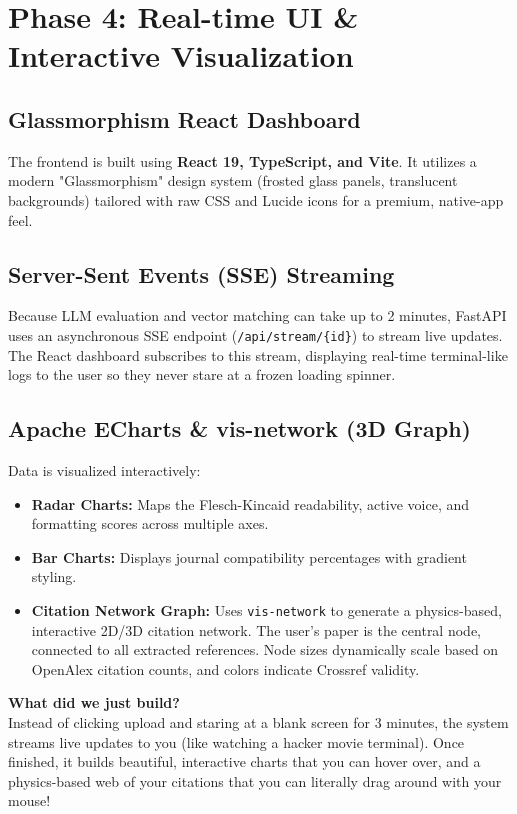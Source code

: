 \documentclass[11pt,a4paper]{article}
\begin{document}
\bigskip

\section{Phase 4: Real-time UI \& Interactive Visualization}

\subsection*{Glassmorphism React Dashboard}
The frontend is built using \textbf{React 19, TypeScript, and Vite}. It utilizes a modern "Glassmorphism" design system (frosted glass panels, translucent backgrounds) tailored with raw CSS and Lucide icons for a premium, native-app feel.

\subsection*{Server-Sent Events (SSE) Streaming}
Because LLM evaluation and vector matching can take up to 2 minutes, FastAPI uses an asynchronous SSE endpoint (\texttt{/api/stream/\{id\}}) to stream live updates. The React dashboard subscribes to this stream, displaying real-time terminal-like logs to the user so they never stare at a frozen loading spinner.

\subsection*{Apache ECharts \& vis-network (3D Graph)}
Data is visualized interactively:
\begin{itemize}
    \item \textbf{Radar Charts:} Maps the Flesch-Kincaid readability, active voice, and formatting scores across multiple axes.
    \item \textbf{Bar Charts:} Displays journal compatibility percentages with gradient styling.
    \item \textbf{Citation Network Graph:} Uses \texttt{vis-network} to generate a physics-based, interactive 2D/3D citation network. The user's paper is the central node, connected to all extracted references. Node sizes dynamically scale based on OpenAlex citation counts, and colors indicate Crossref validity.
\end{itemize}

\vspace{0.5cm}
\begin{tcolorbox}[colback=blue!5,colframe=blue!40!black,title=For Dummies: Real-Time UI]
\textbf{What did we just build?} \\
Instead of clicking upload and staring at a blank screen for 3 minutes, the system streams live updates to you (like watching a hacker movie terminal). Once finished, it builds beautiful, interactive charts that you can hover over, and a physics-based web of your citations that you can literally drag around with your mouse!
\end{tcolorbox}
\end{document}
